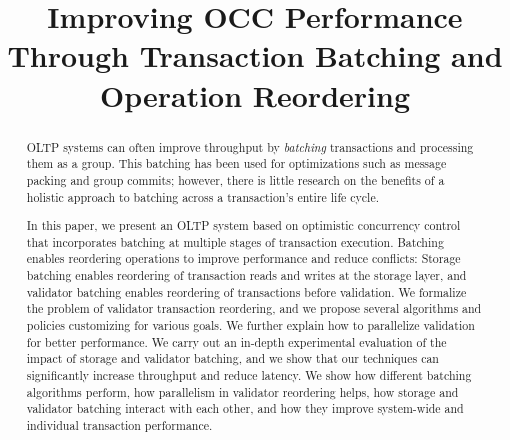 \documentclass[sigconf]{acmart}
\begin{document}

\title{Improving OCC Performance Through Transaction Batching and Operation Reordering}

%
%

\begin{abstract}
	OLTP systems can often improve throughput by \emph{batching} transactions and processing them as a group. This batching has been used for optimizations such as message packing and group commits; however, there is little research on the benefits of a holistic approach to batching across a transaction's entire life cycle. 
	
	In this paper, we present an OLTP system based on optimistic concurrency control that incorporates batching at multiple stages of transaction execution. Batching enables reordering operations to improve performance and reduce conflicts: Storage batching enables reordering of transaction reads and writes at the storage layer, and validator batching enables reordering of transactions before validation. We formalize the problem of validator transaction reordering, and we propose several algorithms and policies customizing for various goals. We further explain how to parallelize validation for better performance. We carry out an in-depth experimental evaluation of the impact of storage and validator batching, and we show that our techniques can significantly increase throughput and reduce latency. We show how different batching algorithms perform, how parallelism in validator reordering helps, how storage and validator batching interact with each other, and how they improve system-wide and individual transaction performance.
\end{abstract}

\maketitle



%
%







\end{document}
